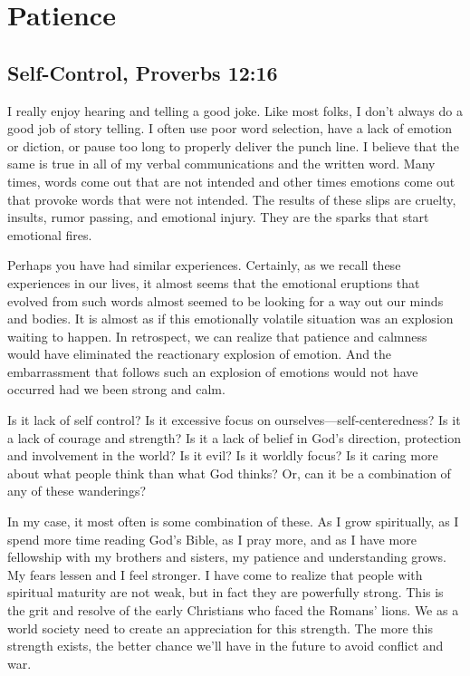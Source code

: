\documentclass[12pt]{memoir}
\begin{document}
\section{Patience}

\subsection[Self-Control]{Self-Control, Proverbs 12:16}
 

I really enjoy hearing and telling a good joke.
Like most folks, I don't always do a good job of story telling.
I often use poor word selection, have a lack of emotion or diction, or pause too long to properly deliver the punch line.
I believe that the same is true in all of my verbal communications and the written word.
Many times, words come out that are not intended and other times emotions come out that provoke words that were not intended.
The results of these slips are cruelty, insults, rumor passing, and emotional injury.
They are the sparks that start emotional fires.

Perhaps you have had similar experiences. Certainly, as we recall
these experiences in our lives, it almost seems that the emotional
eruptions that evolved from such words almost seemed to be looking
for a way out our minds and bodies.
It is almost as if this emotionally volatile situation was an explosion waiting to happen.
In retrospect, we can realize that patience and calmness would have eliminated the reactionary explosion of emotion.
And the embarrassment that follows such an explosion of emotions would not have occurred had we been strong and calm.

Is it lack of self control? Is it excessive focus on ourselves---self-centeredness?
Is it a lack of courage and strength? Is it a lack of belief in God's
direction, protection and involvement in the world? Is it evil? Is
it worldly focus? Is it caring more about what people think than what
God thinks? Or, can it be a combination of any of these wanderings?

In my case, it most often is some combination of these. As I grow spiritually, as I spend more time reading God's Bible, as I pray more,
and as I have more fellowship with my brothers and sisters, my patience and understanding grows. My fears lessen and I feel stronger.
I have come to realize that people with spiritual maturity are not
weak, but in fact they are powerfully strong. This is the grit and
resolve of the early Christians who faced the Romans' lions. We as
a world society need to create an appreciation for this strength.
The more this strength exists, the better chance we'll have in the
future to avoid conflict and war.
\end{document}
